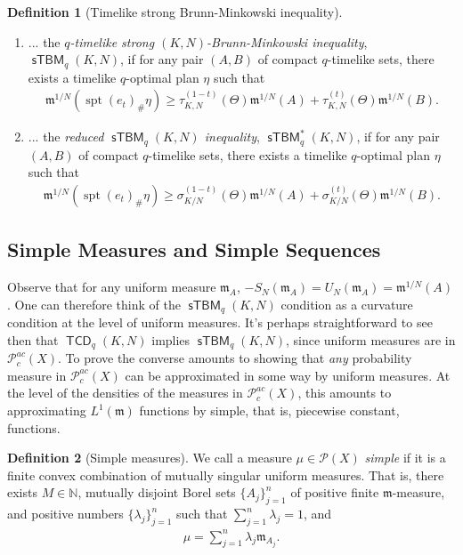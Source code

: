 \documentclass{article}
\newcommand{\N}{\mathbb{N}}
\newcommand{\m}{\mathfrak{m}}
\DeclareMathOperator{\spt}{spt}
\newcommand{\Pcal}{\mathcal{P}}
\DeclareMathOperator{\TCD}{\mathsf{TCD}}
\DeclareMathOperator{\sTBM}{\mathsf{sTBM}}
\theoremstyle{definition}
\newtheorem{defn}{Definition}[section]
\begin{document}
{\begin{defn}[Timelike strong Brunn-Minkowski inequality]
\begin{enumerate}
\item ... the {\it $q$-timelike strong $(K,N)$-Brunn-Minkowski inequality}, $\sTBM_q(K,N)$, if for any pair $(A,B)$ of compact $q$-timelike sets, there exists a timelike $q$-optimal plan $\eta$ such that 
\begin{align}
\m^{1/N}(\spt(e_t)_\#\eta)\geq \tau^{(1-t)}_{K,N}(\Theta)\m^{1/N}(A)+\tau^{(t)}_{K,N}(\Theta)\m^{1/N}(B).
\end{align}

\item ... the {\it reduced $\sTBM_q(K,N)$ inequality}, $\sTBM_q^*(K,N)$, if for any pair $(A,B)$ of compact $q$-timelike sets, there exists a timelike $q$-optimal plan $\eta$ such that 
\begin{align}
\m^{1/N}(\spt(e_t)_\#\eta)\geq \sigma^{(1-t)}_{K/N}(\Theta)\m^{1/N}(A)+\sigma^{(t)}_{K/N}(\Theta)\m^{1/N}(B).
\end{align}
\end{enumerate}
\end{defn}

\subsection{Simple Measures and Simple Sequences}
 Observe that for any uniform measure $\m_A$, $-S_N(\m_A)=U_N(\m_A)= \m^{1/N}(A)$. One can therefore think of the $\sTBM_q(K,N)$ condition as a curvature condition at the level of uniform measures. It's perhaps straightforward to see then that $\TCD_q(K,N)$ implies $\sTBM_q(K,N)$, since uniform measures are in $\Pcal_c^{ac}(X)$. To prove the converse amounts to showing that {\it any} probability measure in $\Pcal_c^{ac}(X)$ can be approximated in some way by uniform measures. At the level of the densities of the measures in $\Pcal_c^{ac}(X)$, this amounts to approximating $L^1(\m)$ functions by simple, that is, piecewise constant, functions.  

\begin{defn}[Simple measures]
We call a measure $\mu\in \Pcal(X)$ {\it simple} if it is a finite convex combination of mutually singular uniform measures. That is, there exists $M\in \N$, mutually disjoint Borel sets $\{A_j\}_{j=1}^n$ of positive finite $\m$-measure, and positive numbers $\{\lambda_j\}_{j=1}^n$ such that $\sum_{j=1}^n \lambda_j=1$, and 
\begin{align*}
\mu= \sum_{j=1}^n \lambda_j \m_{A_j}.
\end{align*}
\end{defn}

}
\end{document}

